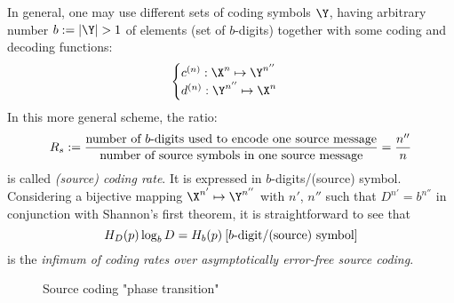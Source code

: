 \documentclass[toc]{../cs-classes/cs-classes}
\begin{document}
\begin{remark}
    In general, one may use different sets of coding symbols $\Y$, having arbitrary number $b:=|\Y|>1$ of elements (set of $b$-digits) together with some coding and decoding functions:
    \begin{equation*}
        \begin{cases}
            c^{(n)}:\X^n\mapsto \Y^{n''}\\
            d^{(n)}:\Y^{n''}\mapsto \X^n
        \end{cases}
    \end{equation*}
    In this more general scheme, the ratio:
    \begin{equation}
        R_s:=\frac{\textnormal{number of $b$-digits used to encode one source message}}{\textnormal{number of source symbols in one source message}} = \frac{n''}{n}
    \end{equation}
    is called \emph{(source) coding rate}. It is expressed in $b$-digits/(source) symbol. Considering a bijective mapping $\X^{n'}\mapsto \Y^{n''}$ with $n'$, $n''$ such that $D^{n'}=b^{n''}$ in conjunction with Shannon's first theorem, it is straightforward to see that
    \begin{equation*}
        H_D(p)\log_bD = H_b(p) \: \textnormal{[$b$-digit/(source) symbol]}
    \end{equation*}
    is the \emph{infimum of coding rates over asymptotically error-free source coding}.
    \begin{figure}[!ht]
        \center
        \caption{Source coding "phase transition"}
    \end{figure}
\end{remark}
\end{document}
